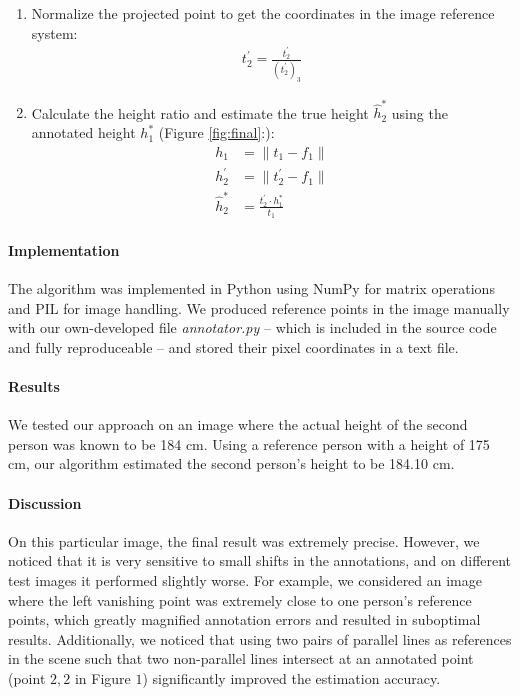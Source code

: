 \begin{enumerate}
    \item Normalize the projected point to get the coordinates in the image reference system:
    \begin{align*}
        t_2^{\prime} = \frac{t_2^{\prime}}{(t_2^{\prime})_3}
    \end{align*}

    \item Calculate the height ratio and estimate the true height $\hat{h}^*_2$ using the annotated height $h^*_1$ (Figure \ref{fig:final}:):
    \begin{align*}
        h_1 &= \|t_1 - f_1\| \\
        h_2^{\prime} &= \|t_2^{\prime} - f_1\| \\
        \hat{h}^*_2 &= \frac{t_2^{\prime} \cdot h^*_1}{t_1}
    \end{align*}
    
\end{enumerate}

\paragraph{Implementation} The algorithm was implemented in Python using NumPy for matrix operations and PIL for image handling. We produced reference points in the image manually with our own-developed file \textit{annotator.py} – which is included in the source code and fully reproduceable – and stored their pixel coordinates in a text file.

\paragraph{Results} We tested our approach on an image where the actual height of the second person was known to be 184 cm. Using a reference person with a height of 175 cm, our algorithm estimated the second person's height to be 184.10 cm.

\paragraph{Discussion} On this particular image, the final result was extremely precise. However, we noticed that it is very sensitive to small shifts in the annotations, and on different test images it performed slightly worse. For example, we considered an image where the left vanishing point was extremely close to one person's reference points, which greatly magnified annotation errors and resulted in suboptimal results. Additionally, we noticed that using two pairs of parallel lines as references in the scene such that two non-parallel lines intersect at an annotated point (point $2,2$ in Figure $1$) significantly improved the estimation accuracy.  

